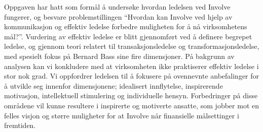 Oppgaven har hatt som formål å undersøke hvordan ledelsen ved Involve fungerer, og besvare problemstillingen “Hvordan kan Involve ved hjelp av kommunikasjon og effektiv ledelse forbedre muligheten for å nå virksomhetens mål?”. Vurdering av effektiv ledelse er blitt gjennomført ved å definere begrepet ledelse, og gjennom teori relatert til transaksjonsledelse og transformasjonsledelse, med spesielt fokus på Bernard Bass sine fire dimensjoner. På bakgrunn av analysen kan vi konkludere med at virksomheten ikke praktiserer effektiv ledelse i stor nok grad. Vi oppfordrer ledelsen til å fokusere på ovennevnte anbefalinger for å utvikle seg innenfor dimensjonene; idealisert innflytelse, inspirerende motivasjon, intellektuell stimulering og individuelle hensyn. Forbedringer på disse områdene vil kunne resultere i inspirerte og motiverte ansatte, som jobber mot en felles visjon og større muligheter for at Involve når finansielle målsettinger i fremtiden. 